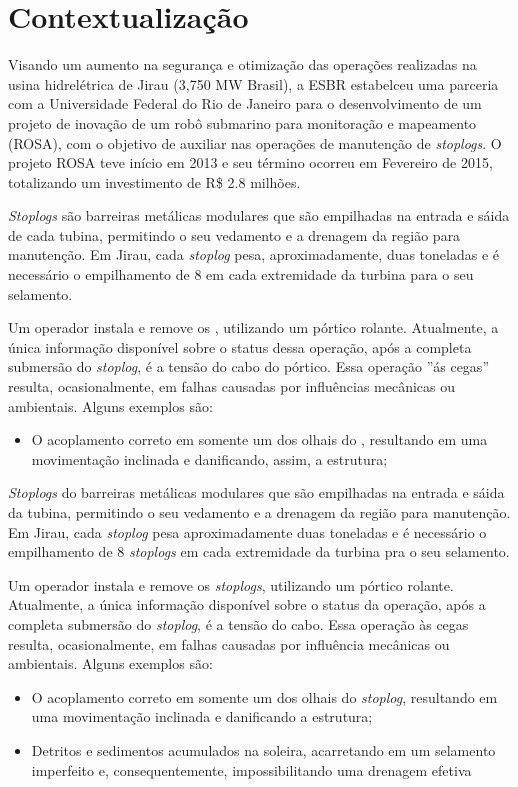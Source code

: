 \section{Contextualização}
Visando um aumento na segurança e otimização das operações realizadas na usina 
hidrelétrica de Jirau (3,750 MW Brasil), a ESBR estabelceu uma parceria com a 
Universidade Federal do Rio de Janeiro para o desenvolvimento de um projeto de 
inovação de um robô submarino para monitoração e mapeamento (ROSA), com o
objetivo de auxiliar nas operações de manutenção de \textit{stoplogs}. O projeto
ROSA teve início em 2013 e seu término ocorreu em Fevereiro de 2015, totalizando
um investimento de R\$ 2.8 milhões.

\textit{Stoplogs} são barreiras metálicas modulares que são empilhadas na
entrada e sáida de cada tubina, permitindo o seu vedamento e a drenagem da
região para manutenção. Em Jirau, cada \textit{stoplog} pesa, aproximadamente,
duas toneladas e é necessário o empilhamento de 8  em cada extremidade
da turbina para o seu selamento.

Um operador instala e remove os , utilizando um pórtico
rolante. Atualmente, a única informação disponível sobre o status dessa
operação, após a completa submersão do \textit{stoplog}, é a tensão do cabo do
pórtico. Essa operação ''ás cegas'' resulta, ocasionalmente, em falhas causadas 
por influências mecânicas ou ambientais. Alguns exemplos são:

\begin{itemize}
  \item O acoplamento correto em somente um dos olhais do ,
  resultando em uma movimentação inclinada e danificando, assim, a estrutura;
\end{itemize}

\textit{Stoplogs} do barreiras metálicas modulares que são empilhadas na entrada
e sáida da tubina, permitindo o seu vedamento e a drenagem da região para
manutenção. Em Jirau, cada \textit{stoplog} pesa aproximadamente duas toneladas
e é necessário o empilhamento de 8 \textit{stoplogs} em cada extremidade da
turbina pra o seu selamento.

Um operador instala e remove os \textit{stoplogs}, utilizando um pórtico
rolante. Atualmente, a única informação disponível sobre o status da operação,
após a completa submersão do \textit{stoplog}, é a tensão do cabo. Essa operação
às cegas resulta, ocasionalmente, em falhas causadas por influência mecânicas ou
ambientais. Alguns exemplos são:
\begin{itemize}
  \item O acoplamento correto em somente um dos olhais do \textit{stoplog},
  resultando em uma movimentação inclinada e danificando a estrutura;
  \item Detritos e sedimentos acumulados na soleira, acarretando em um selamento
  imperfeito e, consequentemente, impossibilitando uma drenagem efetiva
\end{itemize}

